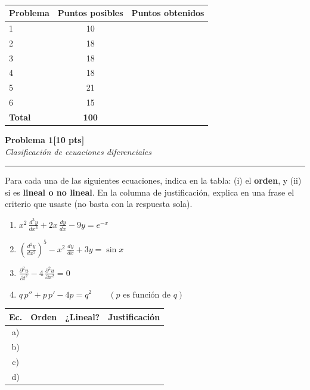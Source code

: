 \documentclass[11pt,letterpaper]{article}
\newcommand{\problema}[3]{%
  \bigskip\bigskip\noindent
  {\Large\textbf{Problema #1}}\hfill\textbf{[#2 pts]}\\[3pt]
  {\small\itshape #3}\par
  \vspace{2pt}\hrule\vspace{8pt}
}
\renewcommand{\arraystretch}{1.3}
\begin{document}
\vspace{8pt}

\\[4pt]
\begin{tabular}{lcc}
\toprule
Problema & Puntos posibles & Puntos obtenidos \\
\midrule
1 & 10 & \\
2 & 18 & \\
3 & 18 & \\
4 & 18 & \\
5 & 21 & \\
6 & 15 & \\
\midrule
\textbf{Total} & \textbf{100} & \\
\bottomrule
\end{tabular}


\problema{1}{10}{Clasificación de ecuaciones diferenciales}

Para cada una de las siguientes ecuaciones, indica en la tabla: (i) el \textbf{orden}, y (ii) si es \textbf{lineal o no lineal}. En la columna de justificación, explica en una frase el criterio que usaste (no basta con la respuesta sola).

\begin{enumerate}[label=\textbf{\alph*)}, leftmargin=2em, itemsep=10pt]
  \item $\displaystyle x^2\,\frac{d^3y}{dx^3} + 2x\,\frac{dy}{dx} - 9y = e^{-x}$
  \item $\displaystyle \left(\frac{d^2y}{dx^2}\right)^{5} - x^2\,\frac{dy}{dx} + 3y = \sin x$
  \item $\displaystyle \frac{\partial^2 u}{\partial t^2} - 4\,\frac{\partial^2 u}{\partial x^2} = 0$
  \item $\displaystyle q\, p'' + p\,p' - 4p = q^2 \qquad (p \text{ es función de } q)$
\end{enumerate}

\renewcommand{\arraystretch}{2.6}
\noindent\begin{tabular}{|c|>{\centering\arraybackslash}p{1.6cm}|>{\centering\arraybackslash}p{2cm}|>{\arraybackslash}p{7.9cm}|}
\hline
\textbf{Ec.} & \textbf{Orden} & \textbf{¿Lineal?} & \textbf{Justificación} \\
\hline
a) & & & \\
\hline
b) & & & \\
\hline
c) & & & \\
\hline
d) & & & \\
\hline
\end{tabular}
\renewcommand{\arraystretch}{1.3}
\end{document}
